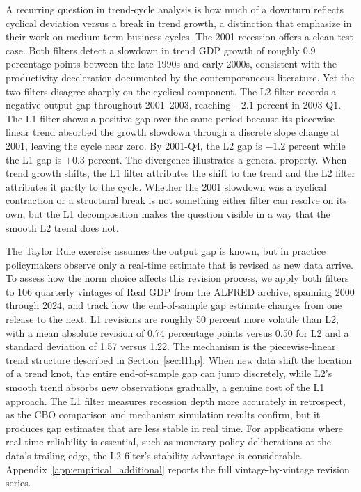 \documentclass[10pt]{article}
\begin{document}
A recurring question in trend-cycle analysis is how much of a downturn reflects cyclical deviation versus a break in trend growth, a distinction that \citet{comin_gertler2006} emphasize in their work on medium-term business cycles. The 2001 recession offers a clean test case. Both filters detect a slowdown in trend GDP growth of roughly 0.9 percentage points between the late 1990s and early 2000s, consistent with the productivity deceleration documented by the contemporaneous literature. Yet the two filters disagree sharply on the cyclical component. The L2 filter records a negative output gap throughout 2001--2003, reaching $-2.1$ percent in 2003-Q1. The L1 filter shows a positive gap over the same period because its piecewise-linear trend absorbed the growth slowdown through a discrete slope change at 2001, leaving the cycle near zero. By 2001-Q4, the L2 gap is $-1.2$ percent while the L1 gap is $+0.3$ percent. The divergence illustrates a general property. When trend growth shifts, the L1 filter attributes the shift to the trend and the L2 filter attributes it partly to the cycle. Whether the 2001 slowdown was a cyclical contraction or a structural break is not something either filter can resolve on its own, but the L1 decomposition makes the question visible in a way that the smooth L2 trend does not.

The Taylor Rule exercise assumes the output gap is known, but in practice policymakers observe only a real-time estimate that is revised as new data arrive. To assess how the norm choice affects this revision process, we apply both filters to 106 quarterly vintages of Real GDP from the ALFRED archive, spanning 2000 through 2024, and track how the end-of-sample gap estimate changes from one release to the next. L1 revisions are roughly 50 percent more volatile than L2, with a mean absolute revision of 0.74 percentage points versus 0.50 for L2 and a standard deviation of 1.57 versus 1.22. The mechanism is the piecewise-linear trend structure described in Section~\ref{sec:l1hp}. When new data shift the location of a trend knot, the entire end-of-sample gap can jump discretely, while L2's smooth trend absorbs new observations gradually, a genuine cost of the L1 approach. The L1 filter measures recession depth more accurately in retrospect, as the CBO comparison and mechanism simulation results confirm, but it produces gap estimates that are less stable in real time. For applications where real-time reliability is essential, such as monetary policy deliberations at the data's trailing edge, the L2 filter's stability advantage is considerable. Appendix~\ref{app:empirical_additional} reports the full vintage-by-vintage revision series.
\end{document}
